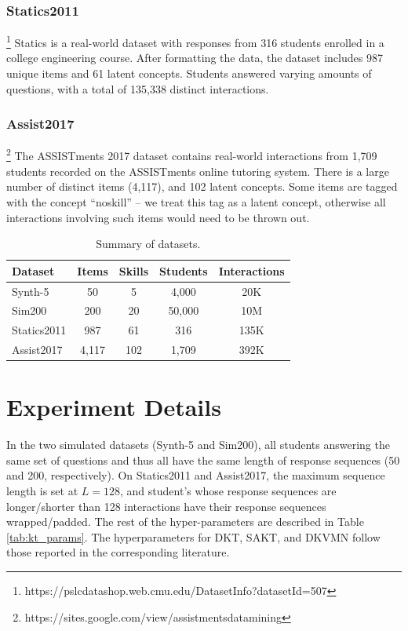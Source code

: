 \subsubsection*{Statics2011}\footnote{https://pslcdatashop.web.cmu.edu/DatasetInfo?datasetId=507}
Statics is a real-world dataset with responses from 316 students enrolled in a college engineering course. After formatting the data, the dataset includes 987 unique items and 61 latent concepts. Students answered varying amounts of questions, with a total of 135,338 distinct interactions.

\subsubsection*{Assist2017}\footnote{https://sites.google.com/view/assistmentsdatamining}
The ASSISTments 2017 dataset contains real-world interactions from 1,709 students recorded on the ASSISTments online tutoring system. There is a large number of distinct items (4,117), and 102 latent concepts. Some items are tagged with the concept ``noskill'' -- we treat this tag as a latent concept, otherwise all interactions involving such items would need to be thrown out.

\begin{table}
  \centering
  \begin{tabular}{l c c c c}
    \hline
    Dataset & Items & Skills & Students & Interactions \\
    \hline
    Synth-5 & 50 & 5 & 4,000 & 20K \\
    Sim200 & 200 & 20 & 50,000 & 10M \\
    Statics2011 & 987 & 61 & 316 & 135K \\
    Assist2017 & 4,117 & 102 & 1,709 & 392K \\
  \end{tabular}
  \caption{Summary of datasets.}
  \label{tab:kt_data}
\end{table}


\section{Experiment Details}
In the two simulated datasets (Synth-5 and Sim200), all students answering the same set of questions and thus all have the same length of response sequences (50 and 200, respectively). On Statics2011 and Assist2017, the maximum sequence length is set at $L=128$, and student's whose response sequences are longer/shorter than 128 interactions have their response sequences wrapped/padded. The rest of the hyper-parameters are described in Table \ref{tab:kt_params}. The hyperparameters for DKT, SAKT, and DKVMN follow those reported in the corresponding literature.

